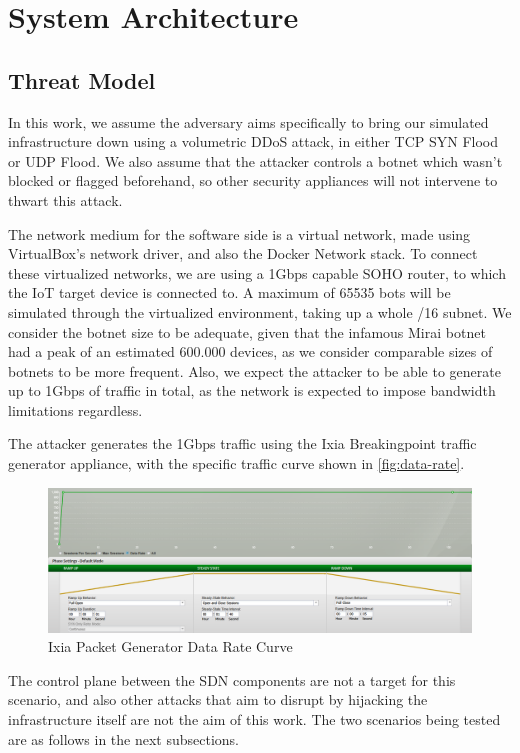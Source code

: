\chapter{System Architecture}
\label{chap:architecture}
\section{Threat Model}
In this work, we assume the adversary aims specifically to bring our simulated infrastructure down using a volumetric DDoS attack, in either TCP SYN Flood or UDP Flood. We also assume that the attacker controls a botnet which wasn't blocked or flagged beforehand, so other security appliances will not intervene to thwart this attack.

The network medium for the software side is a virtual network, made using VirtualBox's network driver, and also the Docker Network stack. To connect these virtualized networks, we are using a 1Gbps capable SOHO router, to which the IoT target device is connected to. A maximum of 65535 bots will be simulated through the virtualized environment, taking up a whole /16 subnet. We consider the botnet size to be adequate, given that the infamous Mirai botnet had a peak of an estimated 600.000 devices\cite{antonakakis2017}, as we consider comparable sizes of botnets to be more frequent. Also, we expect the attacker to be able to generate up to 1Gbps of traffic in total, as the network is expected to impose bandwidth limitations regardless.

The attacker generates the 1Gbps traffic using the Ixia Breakingpoint traffic generator appliance, with the specific traffic curve shown in \autoref{fig:data-rate}\cite{vladescu2025}.

\begin{figure}
    \centering
    \includegraphics[width=1\linewidth]{images/breakingpoint_curve.png}
    \caption{Ixia Packet Generator Data Rate Curve}
    \label{fig:data-rate}
\end{figure}


The control plane between the SDN components are not a target for this scenario, and also other attacks that aim to disrupt by hijacking the infrastructure itself are not the aim of this work.
The two scenarios being tested are as follows in the next subsections.

